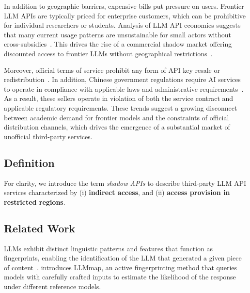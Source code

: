 \documentclass[letterpaper,twocolumn,10pt]{article}
\begin{document}
In addition to geographic barriers, expensive bills put pressure on users.
Frontier LLM APIs are typically priced for enterprise customers, which can be prohibitive for individual researchers or students. 
Analysis of LLM API economics suggests that many current usage patterns are unsustainable for small actors without cross-subsidies~\cite{A253}.
This drives the rise of a commercial shadow market offering discounted access to frontier LLMs without geographical restrictions~\cite{Q252,K24}.

Moreover, official terms of service prohibit any form of API key resale or redistribution~\cite{O251}.
In addition, Chinese government regulations require AI services to operate in compliance with applicable laws and administrative requirements~\cite{CAC23}.
As a result, these sellers operate in violation of both the service contract and applicable regulatory requirements.
These trends suggest a growing disconnect between academic demand for frontier models and the constraints of official distribution channels, which drives the emergence of a substantial market of unofficial third-party services.

\subsection{Definition}

For clarity, we introduce the term \textit{shadow APIs} to describe third-party LLM API services characterized by
(i) \textbf{indirect access}, and
(ii) \textbf{access provision in restricted regions}.

\subsection{Related Work}

LLMs exhibit distinct linguistic patterns and features that function as fingerprints, enabling the identification of the LLM that generated a given piece of content~\cite{MSSA25, YCWPWC23, BZTYZY23}.
\cite{PKA25} introduces LLMmap, an active fingerprinting method that queries models with carefully crafted inputs to estimate the likelihood of the response under different reference models.
\end{document}

